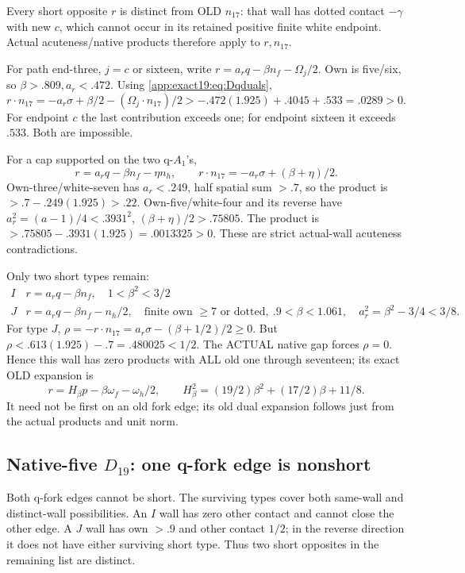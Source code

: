 \documentclass[11pt]{article}
\theoremstyle{definition}
\theoremstyle{remark}
\begin{document}
Every short opposite \(r\) is
distinct from OLD \(n_{17}\):
that wall has dotted contact
\(-\gamma\) with new \(c\), which
cannot occur in its retained
positive finite white endpoint.
Actual acuteness/native products
therefore apply to \(r,n_{17}\).

For path end-three, \(j=c\) or
sixteen, write
\(r=a_rq-\beta n_f-\Omega_j/2\).
Own is five/six, so
\(\beta>.809,a_r<.472\).
Using \eqref{app:exact19:eq:Dqduals},
\[
 r\cdot n_{17}
     =-a_r\sigma+\beta/2-(\Omega_j\cdot n_{17})/2
          >-.472(1.925)+.4045+.533=.0289>0 .
\]
For endpoint \(c\) the last
contribution exceeds one; for
endpoint sixteen it exceeds
\(.533\).
Both are impossible.

For a cap supported on the two
q-\(A_1\)'s,
\[
 r=a_rq-\beta n_f-\eta n_h,\qquad
           r\cdot n_{17}=-a_r\sigma+(\beta+\eta)/2 .
\]
Own-three/white-seven has
\(a_r<.249\), half spatial sum
\(>.7\), so the product is
\(>.7-.249(1.925)>.22\).
Own-five/white-four and its
reverse have
\(a_r^2=(a-1)/4<.3931^2\),
\((\beta+\eta)/2>.75805\).
The product is
\(>.75805-.3931(1.925)=.0013325>0\).
These are strict actual-wall
acuteness contradictions.

Only two short types remain:
\[
\begin{array}{c|c}
 I&r=a_rq-\beta n_f,\quad1<\beta^2<3/2\\
 J&r=a_rq-\beta n_f-n_h/2,\quad
      \text{finite own }\ge7\text{ or dotted},\
      .9<\beta<1.061,\quad a_r^2=\beta^2-3/4<3/8 .
\end{array}
\]
For type \(J\),
\(\rho=-r\cdot n_{17}
=a_r\sigma-(\beta+1/2)/2\ge0\).
But
\(\rho<.613(1.925)-.7=.480025<1/2\).
The ACTUAL native gap forces
\(\rho=0\).
Hence this wall has zero products
with ALL old one through seventeen;
its exact OLD expansion is
\[
 r=H_\beta p-\beta\omega_f-\omega_h/2,\qquad
                 H_\beta^2=(19/2)\beta^2+(17/2)\beta+11/8 .
\tag{D19qJ}\label{app:exact19:eq:DqJ}
\]
It need not be first on an old
fork edge; its old dual expansion
follows just from the actual
products and unit norm.

\subsection[Native-five D19: one q-fork edge is nonshort]{Native-five \(D_{19}\): one q-fork edge is nonshort}
\label{app:exact19:Dfiveqnonshort}

Both q-fork edges cannot be short.
The surviving types cover both
same-wall and distinct-wall
possibilities.
An \(I\) wall has zero other
contact and cannot close the
other edge.
A \(J\) wall has own \(>.9\)
and other contact \(1/2\);
in the reverse direction it
does not have either surviving
short type.
Thus two short opposites in
the remaining list are distinct.
\end{document}
